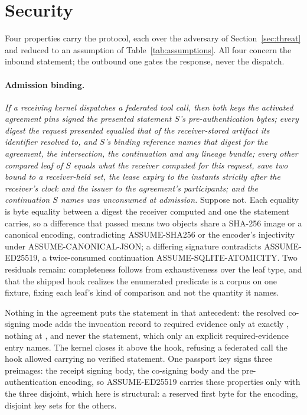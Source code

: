 \section{Security}
\label{sec:security}

Four properties carry the protocol, each over the adversary of
Section~\ref{sec:threat} and reduced to an assumption of
Table~\ref{tab:assumptions}. All four concern the inbound statement; the
outbound one gates the response, never the dispatch.

\paragraph{Admission binding.}
\emph{If a receiving kernel dispatches a federated tool call, then both keys
the activated agreement pins signed the presented statement $S$'s
pre-authentication bytes; every digest the request presented equalled that of
the receiver-stored artifact its identifier resolved to, and $S$'s binding
reference names that digest for the agreement, the intersection, the
continuation and any lineage bundle; every other compared leaf of $S$ equals
what the receiver computed for this request, save two bound to a receiver-held
set, the lease expiry to the instants strictly after the receiver's clock and
the issuer to the agreement's participants; and the continuation $S$ names was
unconsumed at admission.}
Suppose not. Each equality is byte equality between a digest the receiver
computed and one the statement carries, so a difference that passed means two
objects share a SHA-256 image or a canonical encoding, contradicting
ASSUME-SHA256 or the encoder's injectivity under ASSUME-CANONICAL-JSON; a
differing signature contradicts ASSUME-ED25519, a twice-consumed continuation
ASSUME-SQLITE-ATOMICITY. Two residuals remain: completeness follows from
exhaustiveness over the leaf type, and that the shipped hook realizes the
enumerated predicate is a corpus on one fixture, fixing each leaf's kind of
comparison and not the quantity it names.

Nothing in the agreement puts the statement in that antecedent: the resolved
co-signing mode adds the invocation record to required evidence only at exactly
, nothing at , and never
the statement, which only an explicit required-evidence entry names. The kernel
closes it above the hook, refusing a federated call the hook allowed carrying
no verified statement. One passport key signs three preimages: the receipt
signing body, the co-signing body and the pre-authentication encoding, so
ASSUME-ED25519 carries these properties only with the three disjoint, which
here is structural: a reserved first byte for the encoding, disjoint key sets
for the others.

